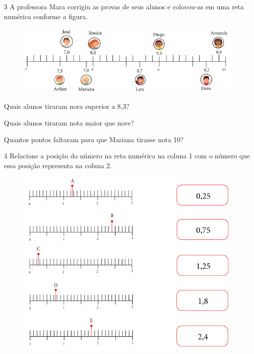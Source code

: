 \num{3} A professora Mara corrigiu as provas de seus alunos e colocou-as em
uma reta numérica conforme a figura.

\begin{figure}[htpb!]
\includegraphics[width=\textwidth]{../ilustracoes/MAT5/SAEB_5ANO_MAT_figura87.png}
\end{figure}

\begin{escolha}
\item
  Quais alunos tiraram nora superior a 8,3?\\

\item
  Quais alunos tiraram nota maior que nove?\\

\item
  Quantos pontos faltaram para que Mariana tirasse nota 10?\\
\end{escolha}

\pagebreak
\num{4} Relacione a posição do número na reta numérica na coluna 1 com o
número que essa posição representa na coluna 2.

\begin{figure}[htpb!]
\centering
\includegraphics[width=.8\textwidth]{../ilustracoes/MAT5/SAEB_5ANO_MAT_figura88.png}
\end{figure}

